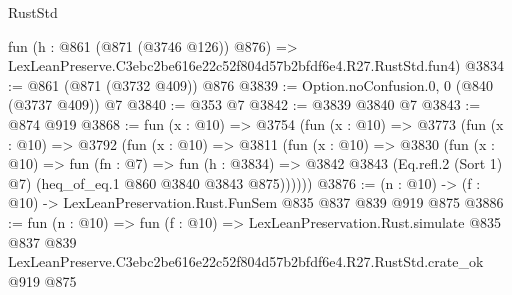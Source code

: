 \begin{lexlean}{RustStd}
\begin{coremodule}
    fun (h : @861 (@871 (@3746 @126)) @876) =>
    LexLeanPreserve.C3ebc2be616e22c52f804d57b2bfdf6e4.R27.RustStd.fun4)
@3834 := @861 (@871 (@3732 @409)) @876
@3839 := Option.noConfusion.{0, 0} (@840 (@3737 @409)) @7
@3840 := @353 @7
@3842 := @3839 @3840 @7
@3843 := @874 @919
@3868 := fun (x : @10) =>
  @3754
    (fun (x : @10) =>
    @3773
      (fun (x : @10) =>
      @3792
        (fun (x : @10) =>
        @3811
          (fun (x : @10) =>
          @3830
            (fun (x : @10) =>
            fun (fn : @7) =>
            fun (h : @3834) =>
            @3842 @3843 (Eq.refl.{2} (Sort 1) @7) (heq_of_eq.{1} @860 @3840 @3843 @875))))))
@3876 := (n : @10) -> (f : @10) -> LexLeanPreservation.Rust.FunSem @835 @837 @839 @919 @875
@3886 := fun (n : @10) =>
  fun (f : @10) =>
  LexLeanPreservation.Rust.simulate
    @835
    @837
    @839
    LexLeanPreserve.C3ebc2be616e22c52f804d57b2bfdf6e4.R27.RustStd.crate_ok
    @919
    @875
\end{coremodule}
\end{lexlean}
